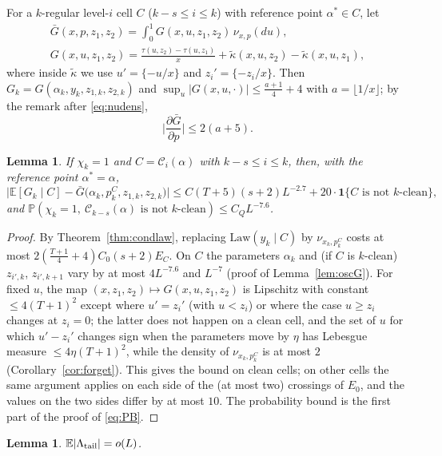 \documentclass[11pt]{amsart}
\newtheorem{lemma}[theorem]{Lemma}
\theoremstyle{definition}
\numberwithin{equation}{section}
\newcommand{\E}{\mathbb{E}}
\newcommand{\Prob}{\mathbb{P}}
\newcommand{\cC}{\mathcal{C}}
\newcommand{\fr}[1]{\{#1\}}
\newcommand{\ind}{\mathbf{1}}
\begin{document}
For a $k$-regular level-$i$ cell $C$ ($k-s\le i\le k$) with reference point $\alpha^*\in C$, let
\begin{gather*}
\bar G(x,p,z_1,z_2)=\int_0^1G(x,u,z_1,z_2)\,\nu_{x,p}(du),\\ G(x,u,z_1,z_2)=\frac{\tau(u,z_2)-\tau(u,z_1)}{x}+\tilde\kappa(x,u,z_2)-\tilde\kappa(x,u,z_1),
\end{gather*}
where inside $\tilde\kappa$ we use $u'=\fr{-u/x}$ and $z_i'=\fr{-z_i/x}$. Then $G_k=G(\alpha_k,y_k,z_{1,k},z_{2,k})$ and
$\sup_u|G(x,u,\cdot)|\le\frac{a+1}4+4$ with $a=\lfloor1/x\rfloor$; by the remark after \eqref{eq:nudens},
\begin{equation}\label{eq:Gbarp}
\Big|\frac{\partial\bar G}{\partial p}\Big|\le2(a+5).
\end{equation}

\begin{lemma}\label{lem:Gbarapprox}
If $\chi_k=1$ and $C=\cC_i(\alpha)$ with $k-s\le i\le k$, then, with the reference point $\alpha^*=\alpha$,
\[
\big|\E[G_k\mid C]-\bar G\big(\alpha_k,p^C_k,z_{1,k},z_{2,k}\big)\big|\le C(T+5)(s+2)L^{-2.7}+20\cdot\ind\{C\text{ is not $k$-clean}\},
\]
and $\Prob(\chi_k=1,\ \cC_{k-s}(\alpha)\text{ is not $k$-clean})\le C_QL^{-7.6}$.
\end{lemma}

\begin{proof}
By Theorem~\ref{thm:condlaw}, replacing $\mathrm{Law}(y_k\mid C)$ by $\nu_{x_k,p^C_k}$ costs at most $2(\frac{T+1}4+4)C_0(s+2)E_C$. On $C$ the parameters
$\alpha_k$ and (if $C$ is $k$-clean) $z_{i',k}$, $z_{i',k+1}$ vary by at most $4L^{-7.6}$ and $L^{-7}$ (proof of Lemma~\ref{lem:oscG}). For fixed $u$, the map
$(x,z_1,z_2)\mapsto G(x,u,z_1,z_2)$ is Lipschitz with constant $\le4(T+1)^2$ except where $u'=z_i'$ (with $u<z_i$) or where the case $u\ge z_i$ changes at
$z_i=0$; the latter does not happen on a clean cell, and the set of $u$ for which $u'-z_i'$ changes sign when the parameters move by $\eta$ has
Lebesgue measure $\le4\eta(T+1)^2$, while the density of $\nu_{x_k,p^C_k}$ is at most $2$ (Corollary~\ref{cor:forget}). This gives the bound on clean cells; on
other cells the same argument applies on each side of the (at most two) crossings of $E_0$, and the values on the two sides differ by at most $10$. The probability bound is
the first part of the proof of \eqref{eq:PB}.
\end{proof}

\begin{lemma}\label{lem:tail}
$\E|\Lambda_{\rm tail}|=o(L)$.
\end{lemma}
\end{document}

